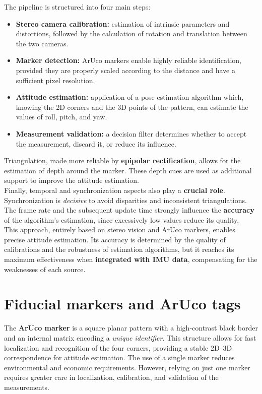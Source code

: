 The pipeline is structured into four main steps:
\begin{itemize}
    \item \textbf{Stereo camera calibration:} estimation of intrinsic parameters and distortions, 
    followed by the calculation of rotation and translation between the two cameras.
    \item \textbf{Marker detection:} ArUco markers enable highly reliable identification, 
    provided they are properly scaled according to the distance and have a sufficient pixel resolution.
    \item \textbf{Attitude estimation:} application of a pose estimation algorithm which, 
    knowing the 2D corners and the 3D points of the pattern, can estimate the values of roll, pitch, and yaw.
    \item \textbf{Measurement validation:} a decision filter determines whether to accept the measurement, 
    discard it, or reduce its influence.
\end{itemize}

Triangulation, made more reliable by \textbf{epipolar rectification}, allows for the estimation of depth around the marker. 
These depth cues are used as additional support to improve the attitude estimation.\\

Finally, temporal and synchronization aspects also play a \textbf{crucial role}. 
Synchronization is \textit{decisive} to avoid disparities and inconsistent triangulations. 
The frame rate and the subsequent update time strongly influence the \textbf{accuracy} of the algorithm’s estimation, 
since excessively low values reduce its quality.\\

This approach, entirely based on stereo vision and ArUco markers, enables precise attitude estimation. 
Its accuracy is determined by the quality of calibrations and the robustness of estimation algorithms, 
but it reaches its maximum effectiveness when \textbf{integrated with IMU data}, 
compensating for the weaknesses of each source.

\section{Fiducial markers and ArUco tags}

The \textbf{ArUco marker} is a square planar pattern with a high-contrast black border and an internal matrix encoding a \textit{unique identifier}. This structure allows for fast localization and recognition of the four corners, providing a stable 2D--3D correspondence for attitude estimation. The use of a single marker reduces environmental and economic requirements. However, relying on just one marker requires greater care in localization, calibration, and validation of the measurements.\\

